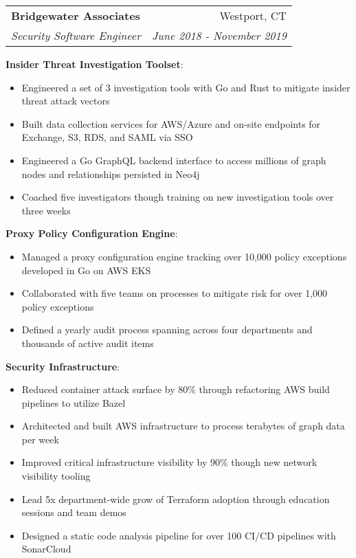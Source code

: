 \documentclass[a4paper]{article}
\makeatletter
\newcommand{\resumeItemNoBullet}[2]{
	\textbf{#1}{: #2 \vspace{-2pt}}
}
\newcommand{\resumeSubheading}[4]{
  \vspace{-1pt}\item
    \begin{tabular*}{0.97\textwidth}[t]{l@{\extracolsep{\fill}}r}
      \textbf{#1} & #2 \\
      \textit{\small#3} & \textit{\small #4} \\
    \end{tabular*}\vspace{-5pt}
}
\makeatother
\begin{document}
	\resumeSubheading
	{Bridgewater Associates}{Westport, CT}
	{Security Software Engineer}{June 2018 - November 2019}
		\begin{itemize}[leftmargin=4pt]
			\vspace{7pt}
			\resumeItemNoBullet{Insider Threat Investigation Toolset}{}
				\begin{itemize}
					\item Engineered a set of 3 investigation tools with Go and Rust to mitigate insider threat attack vectors
					\item Built data collection services for AWS/Azure and on-site endpoints for Exchange, S3, RDS, and SAML via SSO
					\item Engineered a Go GraphQL backend interface to access millions of graph nodes and relationships persisted in Neo4j
					\item Coached five investigators though training on new investigation tools over three weeks
				\end{itemize}

			\resumeItemNoBullet{Proxy Policy Configuration Engine}{}
				\begin{itemize}
					\item Managed a proxy configuration engine tracking over 10,000 policy exceptions developed in Go on AWS EKS
					\item Collaborated with five teams on processes to mitigate risk for over 1,000 policy exceptions
					\item Defined a yearly audit process spanning across four departments and thousands of active audit items
				\end{itemize}

			\resumeItemNoBullet{Security Infrastructure}{}
				\begin{itemize}
					\item Reduced container attack surface by 80\% through refactoring AWS build pipelines to utilize Bazel
					\item Architected and built AWS infrastructure to process terabytes of graph data per week
					\item Improved critical infrastructure visibility by 90\% though new network visibility tooling
					\item Lead 5x department-wide grow of Terraform adoption through education sessions and team demos
					\item Designed a static code analysis pipeline for over 100 CI/CD pipelines with SonarCloud
				\end{itemize}
		\end{itemize}
\end{document}

